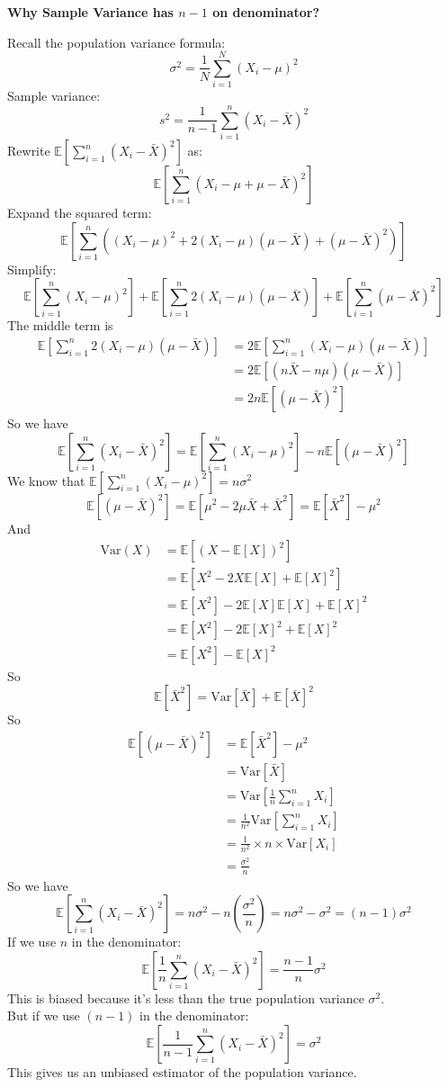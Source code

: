 \documentclass[12pt,letterpaper]{article}
\begin{document}
\begin{center}
{\bf Why Sample Variance has $n-1$ on denominator?}
\end{center}
Recall the population variance formula:
$$\sigma^2=\frac{1}{N}\sum_{i=1}^N(X_i-\mu)^2$$
Sample variance:
\[s^2 = \frac{1}{n-1} \sum_{i=1}^n (X_i - \bar{X})^2\]
Rewrite $\mathbb E[\sum_{i=1}^n (X_i - \bar{X})^2]$ as:
\[\mathbb E[\sum_{i=1}^n (X_i - \mu + \mu - \bar{X})^2]\]
Expand the squared term:
\[\mathbb E[\sum_{i=1}^n ((X_i - \mu)^2 + 2(X_i - \mu)(\mu - \bar{X}) + (\mu - \bar{X})^2)]\]
Simplify:
\[\mathbb E[\sum_{i=1}^n (X_i - \mu)^2] + \mathbb E[\sum_{i=1}^n 2(X_i - \mu)(\mu - \bar{X})] + \mathbb E[\sum_{i=1}^n (\mu - \bar{X})^2]\]
The middle term is
\begin{align*}
	\mathbb E[\sum_{i=1}^n 2(X_i - \mu)(\mu - \bar{X})]&=2\mathbb E[\sum_{i=1}^n (X_i - \mu)(\mu - \bar{X})]\\
	&=2\mathbb E[(n\bar{X}-n\mu)(\mu - \bar{X})]\\
	&=2n\mathbb E[(\mu-\bar{X})^2]
\end{align*}
So we have
\[\mathbb E[\sum_{i=1}^n (X_i - \bar{X})^2]=\mathbb E[\sum_{i=1}^n (X_i - \mu)^2] - n\mathbb E[(\mu - \bar{X})^2]\]
We know that $\mathbb E[\sum_{i=1}^n (X_i - \mu)^2] = n\sigma^2$
$$\mathbb E[(\mu-\bar{X})^2]=\mathbb E[\mu^2-2\mu\bar{X}+\bar{X}^2]=\mathbb E[\bar{X}^2]-\mu^2$$
And \begin{align*}
	\text{Var}(X) &= \mathbb{E}\left[(X - \mathbb{E}[X])^2\right] \\
	&= \mathbb{E}\left[X^2 - 2X\mathbb{E}[X] + \mathbb{E}[X]^2\right] \\
	&= \mathbb{E}[X^2] - 2\mathbb{E}[X]\mathbb{E}[X] + \mathbb{E}[X]^2 \\
	&= \mathbb{E}[X^2] - 2\mathbb{E}[X]^2 + \mathbb{E}[X]^2 \\
	&= \mathbb{E}[X^2] - \mathbb{E}[X]^2
\end{align*}
So $$\mathbb E[\bar{X}^2]=\text{Var}[\bar{X}]+\mathbb E[\bar{X}]^2$$
So \begin{align*}
	\mathbb E[(\mu-\bar{X})^2]&=\mathbb E[\bar{X}^2]-\mu^2\\
	&=\text{Var}[\bar{X}]\\
	&=\text{Var}[\frac{1}{n}\sum_{i=1}^nX_i]\\
	&=\frac{1}{n^2}\text{Var}[\sum_{i=1}^nX_i]\\
	&=\frac{1}{n^2}\times n\times\text{Var}[X_i]\\
	&=\frac{\sigma^2}{n}
\end{align*}	
So we have
\[ \mathbb E[\sum_{i=1}^n (X_i - \bar{X})^2]=n\sigma^2 - n(\frac{\sigma^2}{n}) = n\sigma^2 - \sigma^2= (n-1)\sigma^2\]
If we use $n$ in the denominator:
\[\mathbb E[\frac{1}{n}\sum_{i=1}^n (X_i - \bar{X})^2] = \frac{n-1}{n}\sigma^2\]
This is biased because it's less than the true population variance $\sigma^2$.\medskip\\
But if we use $(n-1)$ in the denominator:
\[\mathbb E[\frac{1}{n-1}\sum_{i=1}^n (X_i - \bar{X})^2] = \sigma^2\]
This gives us an unbiased estimator of the population variance.
\end{document}
